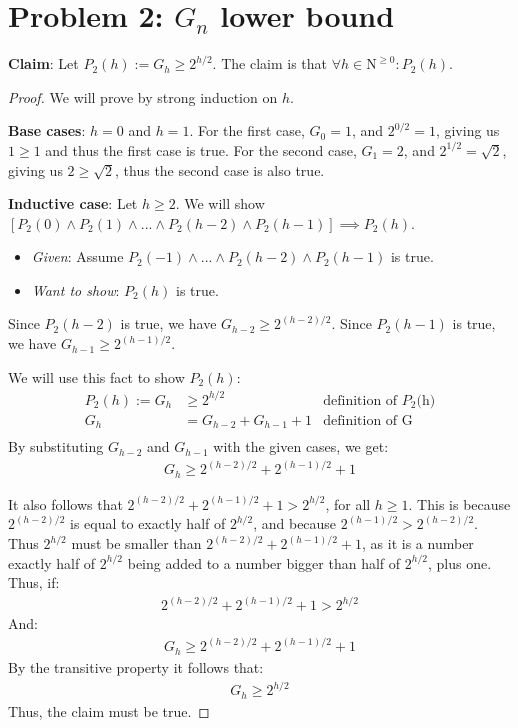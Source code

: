 \documentclass[titlepage]{article}
\begin{document}
\section{Problem 2: $G_n$ lower bound}

\textbf{Claim}: Let $P_2(h) := G_h \geq 2^{h/2}$.  The claim is that $\forall h \in \mathrm{N}^{\geq 0}: P_2(h)$.

\begin{proof}
We will prove by strong induction on $h$.

\textbf{Base cases}: $h=0$ and $h=1$.  For the first case, $G_{0} = 1$, and $2^{0/2} = 1$, giving us $1 \geq 1$ and thus the first case is true. For the second case, $G_1 = 2$, and $2^{1/2} = \sqrt{2}$, giving us $2 \geq \sqrt{2}$, thus the second case is also true. 


\textbf{Inductive case}: Let $h \geq 2$.  We will show $[P_2(0) \land P_2(1) \land ... \land P_2(h-2) \land P_2(h-1)] \implies P_2(h)$.
\begin{itemize}
\item \emph{Given}: Assume $P_2(-1) \land ... \land P_2(h-2) \land P_2(h-1)$ is true.
\item \emph{Want to show}: $P_2(h)$ is true.
\end{itemize}
Since $P_2(h-2)$ is true, we have
$G_{h-2} \geq 2^{(h-2)/2}$.
Since $P_2(h-1)$ is true, we have
$G_{h-1} \geq 2^{(h-1)/2}$.

We will use this fact to show $P_2(h)$:
\begin{align*}
P_2(h) := G_{h} &\geq 2^{h/2} & \text{definition of $P_2$(h)} \\
G_{h} &= G_{h-2} + G_{h-1} + 1 & \text{definition of G} \\
\end{align*}
By substituting $G_{h-2}$ and $G_{h-1}$ with the given cases, we get:\\
\begin{align*}
G_h \geq 2^{(h-2)/2} + 2^{(h-1)/2} + 1
\end{align*}

It also follows that $2^{(h-2)/2} + 2^{(h-1)/2} + 1 > 2^{h/2}$, for all $h \geq 1$. This is because $2^{(h-2)/2}$ is equal to exactly half of $2^{h/2}$, and because $2^{(h-1)/2} > 2^{(h-2)/2}$. Thus $2^{h/2}$ must be smaller than $2^{(h-2)/2} + 2^{(h-1)/2} + 1$, as it is a number exactly half of  $2^{h/2}$ being added to a number bigger than half of $2^{h/2}$, plus one. Thus, if:
\begin{align*}
2^{(h-2)/2} + 2^{(h-1)/2} + 1 > 2^{h/2}
\end{align*}
And:
\begin{align*}
G_h \geq 2^{(h-2)/2} + 2^{(h-1)/2} + 1
\end{align*}
By the transitive property it follows that:
\begin{align*}
G_{h} \geq 2^{h/2}
\end{align*}
Thus, the claim must be true.
\end{proof}
\end{document}
